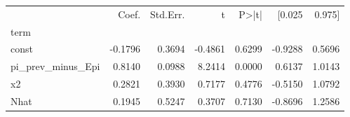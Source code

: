 \begin{tabular}{lrrrrrr}
\toprule
 & Coef. & Std.Err. & t & P>|t| & [0.025 & 0.975] \\
term &  &  &  &  &  &  \\
\midrule
const & -0.1796 & 0.3694 & -0.4861 & 0.6299 & -0.9288 & 0.5696 \\
pi_prev_minus_Epi & 0.8140 & 0.0988 & 8.2414 & 0.0000 & 0.6137 & 1.0143 \\
x2 & 0.2821 & 0.3930 & 0.7177 & 0.4776 & -0.5150 & 1.0792 \\
Nhat & 0.1945 & 0.5247 & 0.3707 & 0.7130 & -0.8696 & 1.2586 \\
\bottomrule
\end{tabular}
